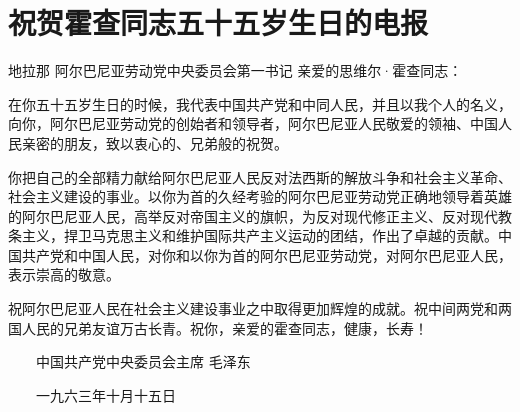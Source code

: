 \section[祝贺霍查同志五十五岁生日的电报（一九六三年十月十五日）]{祝贺霍查同志五十五岁生日的电报}

地拉那
阿尔巴尼亚劳动党中央委员会第一书记
亲爱的思维尔·霍查同志：

在你五十五岁生日的时候，我代表中国共产党和中同人民，并且以我个人的名义，向你，阿尔巴尼亚劳动党的创始者和领导者，阿尔巴尼亚人民敬爱的领袖、中国人民亲密的朋友，致以衷心的、兄弟般的祝贺。

你把自己的全部精力献给阿尔巴尼亚人民反对法西斯的解放斗争和社会主义革命、社会主义建设的事业。以你为首的久经考验的阿尔巴尼亚劳动党正确地领导着英雄的阿尔巴尼亚人民，高举反对帝国主义的旗帜，为反对现代修正主义、反对现代教条主义，捍卫马克思主义和维护国际共产主义运动的团结，作出了卓越的贡献。中国共产党和中国人民，对你和以你为首的阿尔巴尼亚劳动党，对阿尔巴尼亚人民，表示崇高的敬意。

祝阿尔巴尼亚人民在社会主义建设事业之中取得更加辉煌的成就。祝中间两党和两国人民的兄弟友谊万古长青。祝你，亲爱的霍查同志，健康，长寿！

　　中国共产党中央委员会主席 毛泽东

　　一九六三年十月十五日

